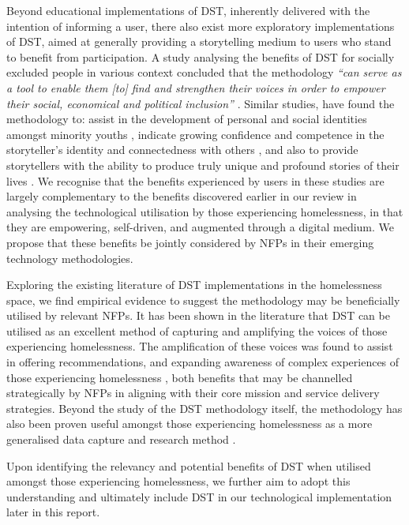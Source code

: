 Beyond educational implementations of DST, inherently delivered with the intention of informing a user, there also exist more exploratory implementations of DST, aimed at generally providing a storytelling medium to users who stand to benefit from participation. A study analysing the benefits of DST for socially excluded people in various context concluded that the methodology \emph{“can serve as a tool to enable them [to] find and strengthen their voices in order to empower their social, economical and political inclusion”} \cite{moutafidou2018digital}. Similar studies, have found the methodology to: assist in the development of personal and social identities amongst minority youths \cite{anderson2019digital}, indicate growing confidence and competence in the storyteller's identity and connectedness with others \cite{podkalicka2010understanding}, and also to provide storytellers with the ability to produce truly unique and profound stories of their lives \cite{hancox2012process}. We recognise that the benefits experienced by users in these studies are largely complementary to the benefits discovered earlier in our review in analysing the technological utilisation by those experiencing homelessness, in that they are empowering, self-driven, and augmented through a digital medium. We propose that these benefits be jointly considered by NFPs in their emerging technology methodologies. 

Exploring the existing literature of DST implementations in the homelessness space, we find empirical evidence to suggest the methodology may be beneficially utilised by relevant NFPs. It has been shown in the literature that DST can be utilised as an excellent method of capturing and amplifying the voices of those experiencing homelessness. The amplification of these voices was found to assist in offering recommendations, and expanding awareness of complex experiences of those experiencing homelessness \cite{schneider2019voices}, both benefits that may be channelled strategically by NFPs in aligning with their core mission and service delivery strategies. Beyond the study of the DST methodology itself, the methodology has also been proven useful amongst those experiencing homelessness as a more generalised data capture and research method \cite{walsh2013aboriginal}.

Upon identifying the relevancy and potential benefits of DST when utilised amongst those experiencing homelessness, we further aim to adopt this understanding and ultimately include DST in our technological implementation later in this report.

